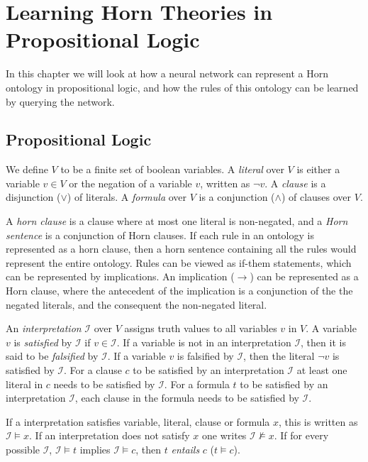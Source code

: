 \chapter{Learning Horn Theories in Propositional Logic}

In this chapter we will look at how a neural network can represent a Horn ontology in propositional logic, and how the rules of this ontology can be learned by querying the network.

\section{Propositional Logic}
We define $V$ to be a finite set of boolean variables. A \emph{literal} over $V$ is either a variable $v \in V$ or the negation of a variable $v$, written as $\neg v$. A \emph{clause} is a disjunction ($\vee$) of literals. A \emph{formula} over $V$ is a conjunction ($\wedge$) of clauses over $V$.

A \emph{horn clause} is a clause where at most one literal is non-negated, and a \emph{Horn sentence} is a conjunction of Horn clauses. If each rule in an ontology is represented as a horn clause, then a horn sentence containing all the rules would represent the entire ontology. Rules can be viewed as if-them statements, which can be represented by implications. An implication ($\rightarrow$) can be represented as a Horn clause, where the antecedent of the implication is a conjunction of the the negated literals, and the consequent the non-negated literal.

An \emph{interpretation} $\mathcal{I}$ over $V$ assigns truth values to all variables $v$ in $V$. A variable $v$ is \emph{satisfied} by $\mathcal{I}$ if $v \in \mathcal{I}$. If a variable is not in an interpretation $\mathcal{I}$, then it is said to be \emph{falsified} by $\mathcal{I}$. If a variable $v$ is falsified by $\mathcal{I}$, then the literal $\neg v$ is satisfied by $\mathcal{I}$. For a clause $c$ to be satisfied by an interpretation $\mathcal{I}$ at least one literal in $c$ needs to be satisfied by $\mathcal{I}$. For a formula $t$ to be satisfied by an interpretation $\mathcal{I}$, each clause in the formula needs to be satisfied by $\mathcal{I}$.

If a interpretation satisfies variable, literal, clause or formula $x$, this is written as $\mathcal{I} \models x$. If an interpretation does not satisfy $x$ one writes $\mathcal{I} \not \models x $. If for every possible $\mathcal{I}$, $\mathcal{I} \models t$ implies $\mathcal{I} \models c$, then $t$ \emph{entails} $c$ ($t \models c$).


